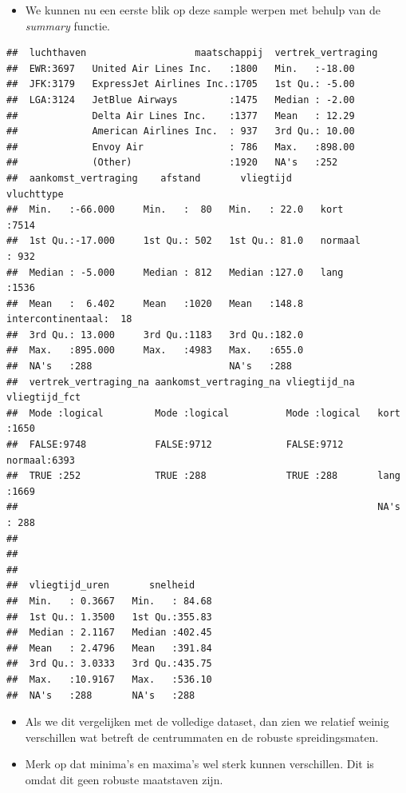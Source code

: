 \documentclass[]{tufte-book}
\providecommand{\tightlist}{%
  \setlength{\itemsep}{0pt}\setlength{\parskip}{0pt}}
\begin{document}
\begin{itemize}
\tightlist
\item
  We kunnen nu een eerste blik op deze sample werpen met behulp van de \emph{summary} functie.
\end{itemize}

\begin{verbatim}
##  luchthaven                   maatschappij  vertrek_vertraging
##  EWR:3697   United Air Lines Inc.   :1800   Min.   :-18.00    
##  JFK:3179   ExpressJet Airlines Inc.:1705   1st Qu.: -5.00    
##  LGA:3124   JetBlue Airways         :1475   Median : -2.00    
##             Delta Air Lines Inc.    :1377   Mean   : 12.29    
##             American Airlines Inc.  : 937   3rd Qu.: 10.00    
##             Envoy Air               : 786   Max.   :898.00    
##             (Other)                 :1920   NA's   :252       
##  aankomst_vertraging    afstand       vliegtijd                 vluchttype  
##  Min.   :-66.000     Min.   :  80   Min.   : 22.0   kort             :7514  
##  1st Qu.:-17.000     1st Qu.: 502   1st Qu.: 81.0   normaal          : 932  
##  Median : -5.000     Median : 812   Median :127.0   lang             :1536  
##  Mean   :  6.402     Mean   :1020   Mean   :148.8   intercontinentaal:  18  
##  3rd Qu.: 13.000     3rd Qu.:1183   3rd Qu.:182.0                           
##  Max.   :895.000     Max.   :4983   Max.   :655.0                           
##  NA's   :288                        NA's   :288                             
##  vertrek_vertraging_na aankomst_vertraging_na vliegtijd_na    vliegtijd_fct 
##  Mode :logical         Mode :logical          Mode :logical   kort   :1650  
##  FALSE:9748            FALSE:9712             FALSE:9712      normaal:6393  
##  TRUE :252             TRUE :288              TRUE :288       lang   :1669  
##                                                               NA's   : 288  
##                                                                             
##                                                                             
##                                                                             
##  vliegtijd_uren       snelheid     
##  Min.   : 0.3667   Min.   : 84.68  
##  1st Qu.: 1.3500   1st Qu.:355.83  
##  Median : 2.1167   Median :402.45  
##  Mean   : 2.4796   Mean   :391.84  
##  3rd Qu.: 3.0333   3rd Qu.:435.75  
##  Max.   :10.9167   Max.   :536.10  
##  NA's   :288       NA's   :288
\end{verbatim}

\begin{itemize}
\tightlist
\item
  Als we dit vergelijken met de volledige dataset, dan zien we relatief weinig verschillen wat betreft de centrummaten en de robuste spreidingsmaten.
\item
  Merk op dat minima's en maxima's wel sterk kunnen verschillen. Dit is omdat dit geen robuste maatstaven zijn.
\end{itemize}
\end{document}
